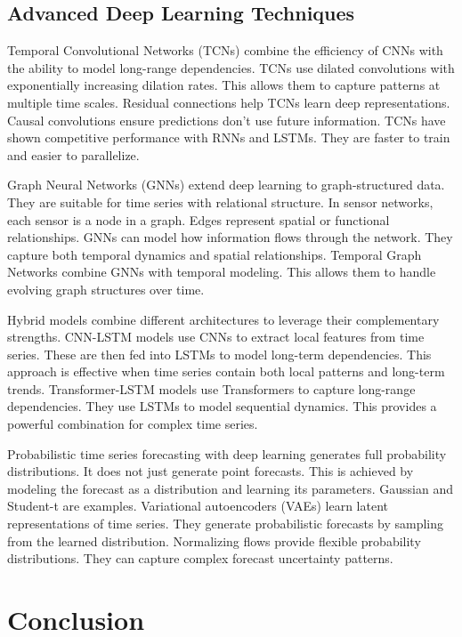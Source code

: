 \subsection{Advanced Deep Learning Techniques}

Temporal Convolutional Networks (TCNs) combine the efficiency of CNNs with the ability to model long-range dependencies. TCNs use dilated convolutions with exponentially increasing dilation rates. This allows them to capture patterns at multiple time scales. Residual connections help TCNs learn deep representations. Causal convolutions ensure predictions don't use future information. TCNs have shown competitive performance with RNNs and LSTMs. They are faster to train and easier to parallelize.

Graph Neural Networks (GNNs) extend deep learning to graph-structured data. They are suitable for time series with relational structure. In sensor networks, each sensor is a node in a graph. Edges represent spatial or functional relationships. GNNs can model how information flows through the network. They capture both temporal dynamics and spatial relationships. Temporal Graph Networks combine GNNs with temporal modeling. This allows them to handle evolving graph structures over time.

Hybrid models combine different architectures to leverage their complementary strengths. CNN-LSTM models use CNNs to extract local features from time series. These are then fed into LSTMs to model long-term dependencies. This approach is effective when time series contain both local patterns and long-term trends. Transformer-LSTM models use Transformers to capture long-range dependencies. They use LSTMs to model sequential dynamics. This provides a powerful combination for complex time series.

Probabilistic time series forecasting with deep learning generates full probability distributions. It does not just generate point forecasts. This is achieved by modeling the forecast as a distribution and learning its parameters. Gaussian and Student-t are examples. Variational autoencoders (VAEs) learn latent representations of time series. They generate probabilistic forecasts by sampling from the learned distribution. Normalizing flows provide flexible probability distributions. They can capture complex forecast uncertainty patterns.



\section{Conclusion}

